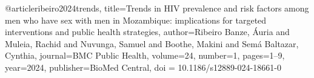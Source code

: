 @article{ribeiro2024trends,
  title={Trends in HIV prevalence and risk factors among men who have sex with men in Mozambique: implications for targeted interventions and public health strategies},
  author={Ribeiro Banze, {\'A}uria and Muleia, Rachid and Nuvunga, Samuel and Boothe, Makini and Sem{\'a} Baltazar, Cynthia},
  journal={BMC Public Health},
  volume={24},
  number={1},
  pages={1--9},
  year={2024},
  publisher={BioMed Central},
doi = {10.1186/s12889-024-18661-0}
}